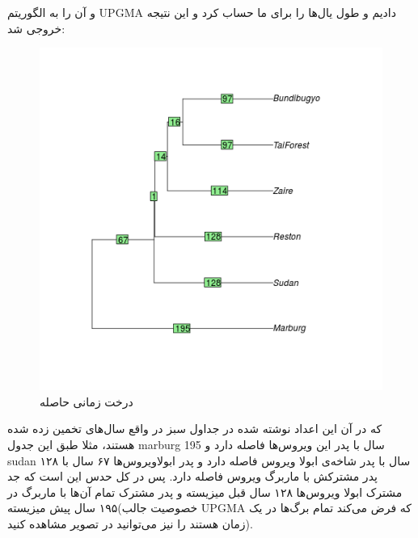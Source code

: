 \documentclass[11pt]{article}
\begin{document}
  
   و آن را به الگوریتم UPGMA دادیم و طول یال‌ها را برای ما حساب کرد و این نتیجه خروجی شد:
\begin{figure}[H]
\centering
\includegraphics[width=\linewidth]{../Data/Trees/times.png}
\caption{ 
درخت زمانی حاصله
  }
\end{figure}
   که در آن این اعداد نوشته شده در جداول سبز در واقع سال‌های تخمین زده شده هستند، مثلا طبق این جدول marburg 195 سال با پدر این ویروس‌ها فاصله دارد و sudan ۱۲۸ سال با پدر شاخه‌ی ابولا ویروس فاصله دارد و پدر ابولاویروس‌ها ۶۷ سال با پدر مشترکش با ماربرگ ویروس فاصله دارد. پس در کل حدس این است که جد مشترک ابولا ویروس‌ها ۱۲۸ سال قبل میزیسته و پدر مشترک تمام آن‌ها با ماربرگ در ۱۹۵ سال پیش میزیسته(خصوصیت جالب UPGMA که فرض می‌کند تمام برگ‌ها در یک زمان هستند را نیز می‌توانید در تصویر مشاهده کنید).
\end{document}
